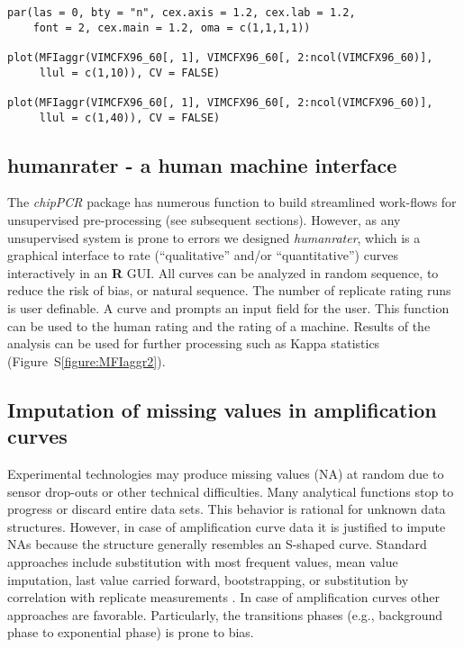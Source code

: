 \documentclass[twocolumn]{bmcart}%
\begin{document}
\begin{figure*}
\begin{verbatim}
par(las = 0, bty = "n", cex.axis = 1.2, cex.lab = 1.2, 
    font = 2, cex.main = 1.2, oma = c(1,1,1,1))

plot(MFIaggr(VIMCFX96_60[, 1], VIMCFX96_60[, 2:ncol(VIMCFX96_60)], 
     llul = c(1,10)), CV = FALSE)

plot(MFIaggr(VIMCFX96_60[, 1], VIMCFX96_60[, 2:ncol(VIMCFX96_60)], 
     llul = c(1,40)), CV = FALSE)
\end{verbatim}
\end{figure*}



\subsection*{humanrater - a human machine interface}

The \emph{chipPCR} package has numerous function to 
build streamlined work-flows for unsupervised pre-processing (see subsequent 
sections). However, as any unsupervised system is prone to errors we designed 
\textsl{humanrater}, which is a graphical interface to rate (``qualitative'' 
and/or ``quantitative'') curves interactively in an \textbf{R} GUI. All curves 
can be analyzed in random sequence, to reduce the risk of bias, or natural 
sequence. The number of replicate 
rating runs is user definable. A curve and prompts an input field for the user. 
This function can be used to 	 the human rating and the rating of a machine. 
Results of the analysis can be used for further processing such as Kappa 
statistics (Figure~S\ref{figure:MFIaggr2}).

\subsection*{Imputation of missing values in amplification curves}

  Experimental technologies may produce missing values (NA) at 
random due to sensor drop-outs or other technical difficulties. Many analytical 
functions stop to progress or discard entire data sets. This 
behavior is rational for unknown data structures. However, in case of 
amplification curve data it is justified to impute NAs because the structure 
generally resembles an S-shaped curve. Standard approaches include substitution 
with most frequent values, mean value imputation, last value carried forward, 
bootstrapping, or substitution by correlation with replicate measurements 
\cite{Harrell_2001}. In case of amplification curves other approaches are 
favorable. Particularly, the transitions phases (e.g., background phase to 
exponential phase) is prone to bias.
\end{document}

